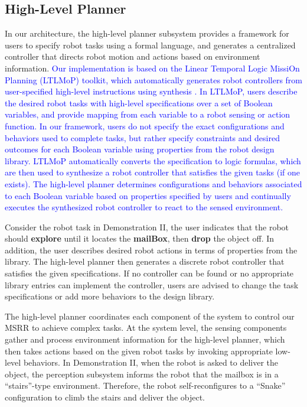 \documentclass[12pt]{article}
\newcommand{\abj}[1]{\textcolor{blue}{#1}}
\begin{document}
\subsection{High-Level Planner}
\label{sec:supplement-high-level}

In our architecture, the high-level planner subsystem provides a framework for users to specify robot tasks using a formal language, and generates a centralized controller that directs robot motion and actions based on environment information.
\abj{Our implementation is based on the Linear Temporal Logic MissiOn Planning (LTLMoP) toolkit, which automatically generates robot controllers from user-specified high-level instructions using synthesis \cite{DBLP:conf/iros/FinucaneJK10,DBLP:journals/trob/Kress-GazitFP09}.
In LTLMoP, users describe the desired robot tasks with high-level specifications over a set of Boolean variables, and provide mapping from each variable to a robot sensing or action function.
In our framework, users do not specify the exact configurations and behaviors used to complete tasks, but rather specify constraints and desired outcomes for each Boolean variable using properties from the robot design library.
LTLMoP automatically converts the specification to logic formulas, which are then used to synthesize a robot controller that satisfies the given tasks (if one exists).
The high-level planner determines configurations and behaviors associated to each Boolean variable based on properties specified by users and continually executes the synthesized robot controller to react to the sensed environment.}

Consider the robot task in Demonstration II, the user indicates that the robot should \textbf{explore} until it locates the \textbf{mailBox}, then \textbf{drop} the object off.
In addition, the user describes desired robot actions in terms of properties from the library.
The high-level planner then generates a discrete robot controller that satisfies the given specifications.
If no controller can be found or no appropriate library entries can implement the controller, users are advised to change the task specifications or add more behaviors to the design library.

The high-level planner coordinates each component of the system to control our MSRR to achieve complex tasks.
At the system level, the sensing components gather and process environment information for the high-level planner, which then takes actions based on the given robot tasks by invoking appropriate low-level behaviors.
In Demonstration II, when the robot is asked to deliver the object, the perception subsystem informs the robot that the mailbox is in a ``stairs''-type environment.
Therefore, the robot self-reconfigures to a ``Snake'' configuration to climb the stairs and deliver the object.
\end{document}

